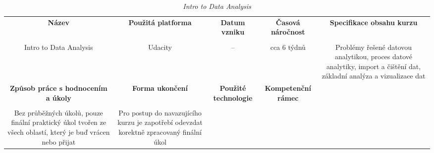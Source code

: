 \begin{landscape}

\begin{table}[htbp]

\renewcommand\thetable{2}

\caption{\textit{Intro to Data Analysis}}\label{tab2}

\footnotesize

{

\justifying

\begin{tabularx}{\linewidth}{CCCCC}

\toprule

\textbf{Název} &

\textbf{Použitá platforma} &

\textbf{Datum vzniku} &

\textbf{Časová náročnost} &
 
\textbf{Specifikace obsahu kurzu}

\\

\tabularnewline
\midrule

Intro to Data Analysis

&

Udacity

&

–

&

cca 6 týdnů

&

Problémy řešené datovou analytikou, proces datové analytiky, import a čištění dat, základní analýza a vizualizace dat

\\
\toprule

\textbf{Způsob práce s hodnocením a úkoly} &

\textbf{Forma ukončení} &

\textbf{Použité technologie} &

\textbf{Kompetenční rámec} 

\\

\tabularnewline
\midrule

Bez průběžných úkolů, pouze finální praktický úkol tvořen ze všech oblastí, který je buď vrácen nebo přijat

&

Pro postup do navazujícího kurzu je zapotřebí odevzdat korektně zpracovaný finální úkol

&


\end{tabularx}}
\end{table}
\end{landscape}
